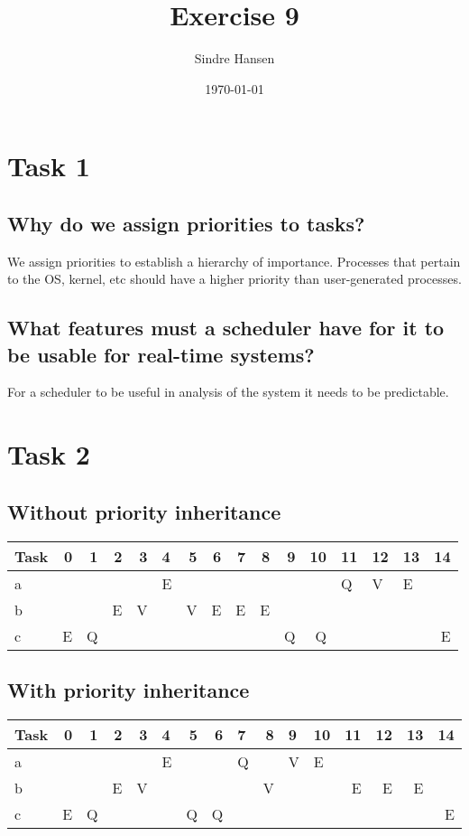 \documentclass[11pt]{article}
\author{Sindre Hansen}
\date{\today}
\title{Exercise 9}
\begin{document}
\maketitle

\section{Task 1}
\label{sec-1}
\subsection{Why do we assign priorities to tasks?}
\label{sec-1-1}
We assign priorities to establish a hierarchy of importance. Processes that pertain to the OS, kernel, etc should have a higher priority than user-generated processes.

\subsection{What features must a scheduler have for it to be usable for real-time systems?}
\label{sec-1-2}
For a scheduler to be useful in analysis of the system it needs to be predictable.

\section{Task 2}
\label{sec-2}
\subsection{Without priority inheritance}
\label{sec-2-1}
\begin{center}
\begin{tabular}{lrrrrlrrrrrrlllr}
Task & 0 & 1 & 2 & 3 & 4 & 5 & 6 & 7 & 8 & 9 & 10 & 11 & 12 & 13 & 14\\
\hline
a &  &  &  &  & E &  &  &  &  &  &  & Q & V & E & \\
b &  &  & E & V &  & V & E & E & E &  &  &  &  &  & \\
c & E & Q &  &  &  &  &  &  &  & Q & Q &  &  &  & E\\
\end{tabular}
\end{center}

\subsection{With priority inheritance}
\label{sec-2-2}
\begin{center}
\begin{tabular}{lrrrrlrrlrllrrrr}
Task & 0 & 1 & 2 & 3 & 4 & 5 & 6 & 7 & 8 & 9 & 10 & 11 & 12 & 13 & 14\\
\hline
a &  &  &  &  & E &  &  & Q &  & V & E &  &  &  & \\
b &  &  & E & V &  &  &  &  & V &  &  & E & E & E & \\
c & E & Q &  &  &  & Q & Q &  &  &  &  &  &  &  & E\\
\end{tabular}
\end{center}
\end{document}
